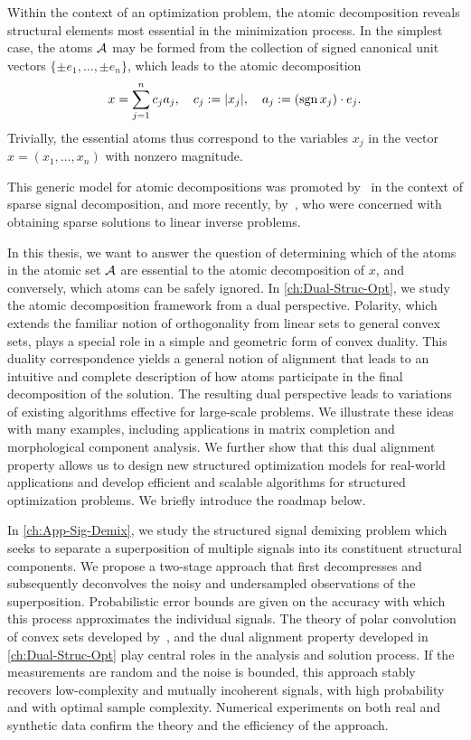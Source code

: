 Within the context of an optimization problem, the atomic decomposition reveals
structural elements most essential in the minimization process.
In the simplest case, the atoms $\mathcal{A}$ may be formed from the collection of
signed canonical unit vectors $\{\pm e_1,\ldots,\pm e_n\}$, which leads to the
atomic decomposition
\[
  x = \sum_{j=1}^n c_j a_j,
  \quad
  c_j: = |x_j|,
  \quad
  a_j:= (\operatorname{sgn} x_j)\cdot e_j.
\]
Trivially, the essential atoms thus correspond to the variables $x_j$ in
the vector $x=(x_1,\ldots,x_n)$ with nonzero magnitude.

This generic model for atomic decompositions was promoted by~\citet{cds98} in the context of sparse signal decomposition, and more recently, by~\citet{chandrasekaran2012convex}, who were concerned with obtaining sparse solutions to linear inverse problems. 

In this thesis, we want to answer the question of determining which of the atoms in the atomic set $\mathcal{A}$ are essential to the atomic decomposition of $x$, and conversely, which atoms can be safely ignored. In \autoref{ch:Dual-Struc-Opt}, we study the atomic decomposition framework from a dual perspective. Polarity, which extends the familiar notion of orthogonality from linear sets to general convex sets, plays a special role in a simple and geometric form of convex duality. This duality correspondence yields a general notion of alignment that leads to an intuitive and complete description of how atoms participate in the final decomposition of the solution. The resulting dual perspective leads to variations of existing algorithms effective for large-scale problems. We illustrate these ideas with many examples, including applications in matrix completion and morphological component analysis. We further show that this dual alignment property allows us to design new structured optimization models for real-world applications and develop efficient and scalable algorithms for structured optimization problems. We briefly introduce the roadmap below. 

In \autoref{ch:App-Sig-Demix}, we study the structured signal demixing problem which seeks to separate a superposition of multiple signals into its constituent structural components. We propose a two-stage approach that first decompresses and subsequently deconvolves the noisy and undersampled observations of the superposition. Probabilistic error bounds are given on the accuracy with which this process approximates the individual signals. The theory of polar convolution of convex sets developed by~\citet{friedlander2019polarconvolution}, and the dual alignment property developed in \autoref{ch:Dual-Struc-Opt} play central roles in the analysis and solution process. If the measurements are random and the noise is bounded, this approach stably recovers low-complexity and mutually incoherent signals, with high probability and with optimal sample complexity. Numerical experiments on both real and synthetic data confirm the theory and the efficiency of the approach.

